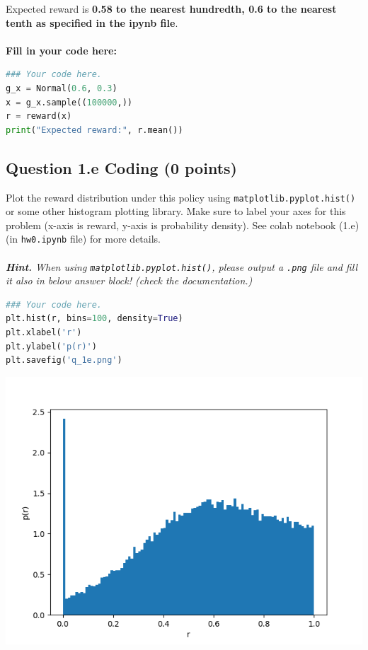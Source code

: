 \documentclass[12pt]{article}
\begin{document}
\begin{solution}
Expected reward is \textbf{0.58 to the nearest hundredth, 0.6 to the nearest tenth as specified in the ipynb file}. 
\\\\
\textbf{Fill in your code here:}
\begin{lstlisting}[language=Python]
### Your code here.
g_x = Normal(0.6, 0.3)
x = g_x.sample((100000,))
r = reward(x)
print("Expected reward:", r.mean())
\end{lstlisting}
\end{solution}

\newpage
\subsection*{Question 1.e \textbf{Coding} (0 points)}
Plot the reward distribution under this policy using \texttt{matplotlib.pyplot.hist()} or some other histogram plotting library. Make sure to label your axes for this problem (x-axis is reward, y-axis is probability density). See colab notebook (1.e) (in \texttt{hw0.ipynb} file) for more details.
\\\\
\textit{\textbf{Hint.} When using \texttt{matplotlib.pyplot.hist()}, please output a \texttt{.png} file and fill it also in below answer block! (check the documentation.)}

\begin{solution}
\begin{lstlisting}[language=Python]
### Your code here.
plt.hist(r, bins=100, density=True)
plt.xlabel('r')
plt.ylabel('p(r)')
plt.savefig('q_1e.png')
\end{lstlisting}

\includegraphics[width = \textwidth]{hw/HW0/q_1e.png}

\end{solution}
\newpage
\end{document}
